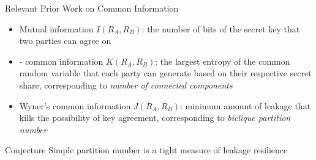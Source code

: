 \begin{frame}{Relevant Prior Work on Common Information}
	\begin{itemize}
		\item Mutual information $ I(R_A, R_B) $: the number of bits of the secret key that two parties can agree on
		\item \gacs-\korner \cite{} common information  $ K(R_A, R_B) $: the largest entropy of the common random variable that each party can generate based on their respective secret share, corresponding to \textit{number of connected components}
		\item Wyner's common information \cite{} $ J(R_A, R_B) $: minimum amount of leakage that kills the possibility of key agreement, corresponding to \textit{biclique partition number}
	\end{itemize}
	\begin{block}{Conjecture}
		Simple partition number is a tight measure of leakage resilience
	\end{block}
	
\end{frame}
